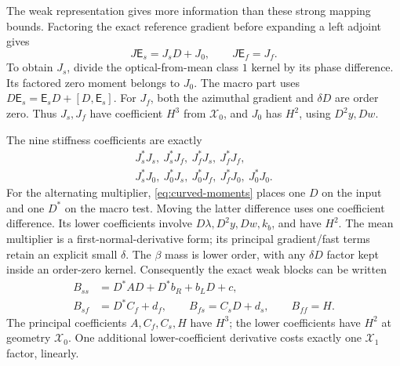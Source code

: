 \documentclass[11pt,a4paper]{article}
\numberwithin{equation}{section}
\theoremstyle{remark}
\newcommand{\Graph}{\mathsf E}
\newcommand{\Xzero}{\mathcal X_0}
\newcommand{\Xone}{\mathcal X_1}
\begin{document}
The weak representation gives more information than these strong
mapping bounds. Factoring the exact reference gradient before
expanding a left adjoint gives
\begin{equation}\label{eq:gradient-factor}
       J\Graph_s=J_sD+J_0,\qquad J\Graph_f=J_f .
\end{equation}
To obtain \(J_s\), divide the optical-from-mean class \(1\) kernel
by its phase difference. Its factored zero moment belongs to \(J_0\).
The macro part uses \(D\Graph_s=\Graph_sD+[D,\Graph_s]\).
For \(J_f\), both the azimuthal gradient and \(\delta D\) are
order zero. Thus \(J_s,J_f\) have coefficient \(H^3\) from \(\Xzero\),
and \(J_0\) has \(H^2\), using \(D^2y,Dw\).

The nine stiffness coefficients are exactly
\[
 \begin{gathered}
 J_s^*J_s,\ J_s^*J_f,\ J_f^*J_s,\ J_f^*J_f,\\
 J_s^*J_0,\ J_0^*J_s,\ J_0^*J_f,\ J_f^*J_0,\ J_0^*J_0 .
 \end{gathered}
\]
For the alternating multiplier, \eqref{eq:curved-moments} places
one \(D\) on the input and one \(D^*\) on the macro test. Moving
the latter difference uses one coefficient difference. Its lower
coefficients involve \(D\lambda,D^2y,Dw,k_b\), and have \(H^2\).
The mean multiplier is a first-normal-derivative form; its
principal gradient/fast terms retain an explicit small \(\delta\).
The \(\beta\) mass is lower order, with any \(\delta D\) factor
kept inside an order-zero kernel. Consequently the exact weak blocks
can be written
\begin{equation}\label{eq:nine-blocks}
 \begin{aligned}
 B_{ss}&=D^*AD+D^*b_R+b_LD+c,\\
 B_{sf}&=D^*C_f+d_f,\qquad
 B_{fs}=C_sD+d_s,\qquad B_{ff}=H .
 \end{aligned}
\end{equation}
The principal coefficients \(A,C_f,C_s,H\) have \(H^3\);
the lower coefficients have \(H^2\) at geometry \(\Xzero\).
One additional lower-coefficient derivative costs exactly one
\(\Xone\) factor, linearly.
\end{document}
